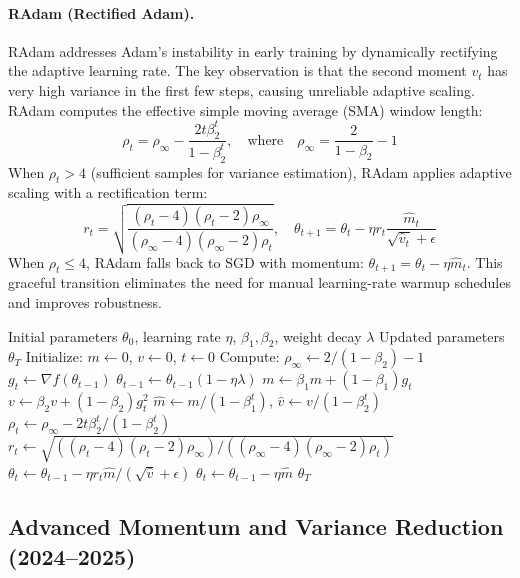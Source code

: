 \documentclass[11pt,a4paper]{article}
\begin{document}
\paragraph{RAdam (Rectified Adam).}
RAdam addresses Adam's instability in early training by dynamically rectifying the adaptive learning rate. The key observation is that the second moment $v_t$ has very high variance in the first few steps, causing unreliable adaptive scaling. RAdam computes the effective simple moving average (SMA) window length:
\[\rho_t = \rho_{\infty} - \frac{2t\beta_2^t}{1-\beta_2^t}, \quad \text{where} \quad \rho_{\infty} = \frac{2}{1-\beta_2}-1\]
When $\rho_t > 4$ (sufficient samples for variance estimation), RAdam applies adaptive scaling with a rectification term:
\[r_t = \sqrt{\frac{(\rho_t-4)(\rho_t-2)\rho_{\infty}}{(\rho_{\infty}-4)(\rho_{\infty}-2)\rho_t}}, \quad \theta_{t+1} = \theta_t - \eta r_t \frac{\hat{m}_t}{\sqrt{\hat{v}_t}+\epsilon}\]
When $\rho_t \leq 4$, RAdam falls back to SGD with momentum: $\theta_{t+1} = \theta_t - \eta\hat{m}_t$. This graceful transition eliminates the need for manual learning-rate warmup schedules and improves robustness.

\begin{algorithm}[H]
\caption{RAdam (Rectified Adam)}
\label{alg:radam}
\begin{algorithmic}[1]
\Require Initial parameters $\theta_0$, learning rate $\eta$, $\beta_1, \beta_2$, weight decay $\lambda$
\Ensure Updated parameters $\theta_T$
\State Initialize: $m \gets 0$, $v \gets 0$, $t \gets 0$
\State Compute: $\rho_\infty \gets 2/(1-\beta_2) - 1$
    \State $g_t \gets \nabla f(\theta_{t-1})$
        \State $\theta_{t-1} \gets \theta_{t-1}(1 - \eta\lambda)$
    \EndIf
    \State $m \gets \beta_1 m + (1-\beta_1) g_t$
    \State $v \gets \beta_2 v + (1-\beta_2) g_t^2$
    \State $\hat{m} \gets m/(1-\beta_1^t)$, $\hat{v} \gets v/(1-\beta_2^t)$
    \State $\rho_t \gets \rho_\infty - 2t \beta_2^t / (1 - \beta_2^t)$
        \State $r_t \gets \sqrt{((\rho_t-4)(\rho_t-2)\rho_\infty) / ((\rho_\infty-4)(\rho_\infty-2)\rho_t)}$
        \State $\theta_t \gets \theta_{t-1} - \eta r_t \hat{m} / (\sqrt{\hat{v}} + \epsilon)$
    \Else
        \State $\theta_t \gets \theta_{t-1} - \eta \hat{m}$ 
    \EndIf
\EndFor
\Return $\theta_T$
\end{algorithmic}
\end{algorithm}

\subsection{Advanced Momentum and Variance Reduction (2024--2025)}
\end{document}

